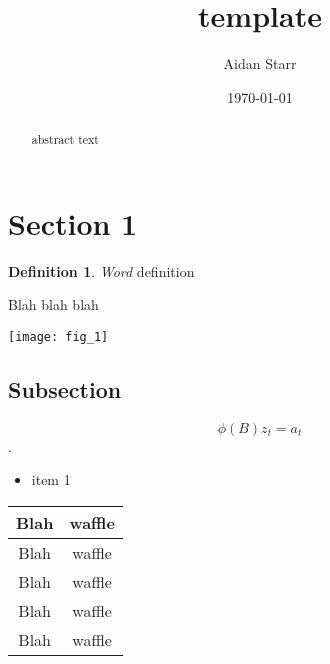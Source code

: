 \documentclass{tufte-handout}
\title{template}
\author[Aidan Starr]{Aidan Starr}
\date{\today}
\theoremstyle{definition}
\newtheorem{definition}{Definition}
\begin{document}
\maketitle

\begin{abstract}
abstract text
\end{abstract}


\section{Section 1}\label{sec:1}
\begin{definition}\textit{Word} definition\end{definition}

Blah blah blah

\begin{marginfigure}
\texttt{[image: fig\_1]}
\label{fig:fig1}
\caption{Figure 1 etc.}
\end{marginfigure} 

\subsection{Subsection}\label{sec:1a}

\begin{equation} \phi(B)z_t = a_t \end{equation}.
\begin{itemize}
\item item 1
\end{itemize}

\begin{margintable}[-15em]
\begin{tabular}{ c c }
    \hline
    Blah  & waffle\\
    \hline
    Blah  & waffle \\
    Blah  & waffle \\
    Blah  & waffle \\
    Blah  & waffle \\
    \hline
\end{tabular}
\caption{Table of blahs and waffles}
\end{margintable}
\end{document}
